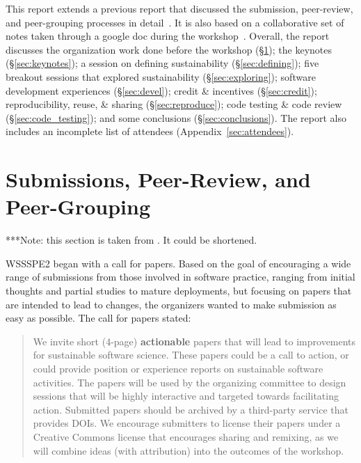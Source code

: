 \documentclass[11pt, oneside]{amsart}
\newcommand{\note}[1]{ {\textcolor{blueish}    { ***Note:      #1 }}}
\begin{document}
This report extends a previous report that discussed the submission,
peer-review, and peer-grouping processes in detail~\cite{WSSSPE2-pre-report}.
It is also based on a collaborative set of notes taken through a google doc
during the workshop~\cite{WSSSPE2-google-notes}. Overall, the report discusses
the organization work done before the workshop (\S\ref{sec:preworkshop}); the
keynotes (\S\ref{sec:keynotes}); a session on defining sustainability
(\S\ref{sec:defining}); five breakout sessions that explored sustainability
(\S\ref{sec:exploring}); software development experiences (\S\ref{sec:devel});
credit \& incentives (\S\ref{sec:credit}); reproducibility, reuse, \& sharing
(\S\ref{sec:reproduce}); code testing \& code review
(\S\ref{sec:code_testing}); and some conclusions (\S\ref{sec:conclusions}). The
report also includes an incomplete list of attendees (Appendix~\ref{sec:attendees}).

\section{Submissions, Peer-Review, and Peer-Grouping} \label{sec:preworkshop}

\note{this section is taken from \cite{WSSSPE2-pre-report}. It could be shortened.}

WSSSPE2 began with a call for papers.
Based on the goal of encouraging a wide range of submissions from those involved
in software practice, ranging from initial thoughts and partial studies to
mature deployments, but focusing on papers that are intended to lead to changes,
the organizers wanted to make submission as easy as possible. The call for
papers stated:

\begin{quote}
We invite short (4-page) \textbf{actionable} papers that will lead to
improvements for sustainable software science. These papers could be a call to
action, or could provide position or experience reports on sustainable software
activities. The papers will be used by the organizing committee to design
sessions that will be highly interactive and targeted towards facilitating
action. Submitted papers should be archived by a third-party service that
provides DOIs. We encourage submitters to license their papers under a Creative
Commons license that encourages sharing and remixing, as we will combine ideas
(with attribution) into the outcomes of the workshop.
\end{quote}
\end{document}
